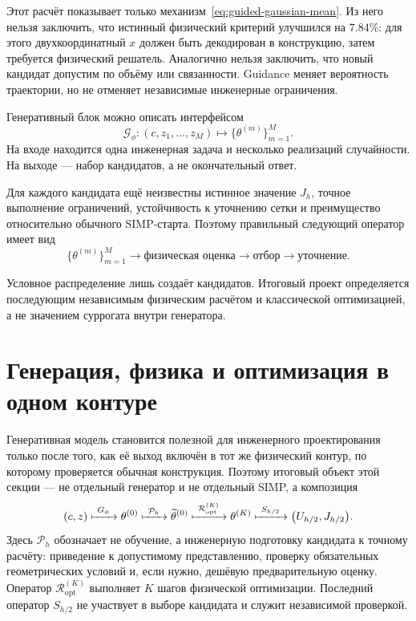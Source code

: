 Этот расчёт показывает только механизм~\eqref{eq:guided-gaussian-mean}. Из него нельзя заключить, что истинный физический критерий улучшился на $7.84\%$: для этого двухкоординатный $x$ должен быть декодирован в конструкцию, затем требуется физический решатель. Аналогично нельзя заключить, что новый кандидат допустим по объёму или связанности. Guidance меняет вероятность траектории, но не отменяет независимые инженерные ограничения.

Генеративный блок можно описать интерфейсом
\begin{equation}
 \mathcal G_\phi:
 (c,z_1,\ldots,z_M)
 \longmapsto
 \{\theta^{(m)}\}_{m=1}^{M}.
\end{equation}
На входе находится одна инженерная задача и несколько реализаций случайности. На выходе --- набор кандидатов, а не окончательный ответ.

Для каждого кандидата ещё неизвестны истинное значение $J_h$, точное выполнение ограничений, устойчивость к уточнению сетки и преимущество относительно обычного SIMP-старта. Поэтому правильный следующий оператор имеет вид
\begin{equation}
 \{\theta^{(m)}\}_{m=1}^{M}
 \longrightarrow
 \text{физическая оценка}
 \longrightarrow
 \text{отбор}
 \longrightarrow
 \text{уточнение}.
\end{equation}

Условное распределение лишь создаёт кандидатов. Итоговый проект определяется последующим независимым физическим расчётом и классической оптимизацией, а не значением суррогата внутри генератора.

\section{Генерация, физика и оптимизация в одном контуре}
\label{sec:generative-optimization-loop}

Генеративная модель становится полезной для инженерного проектирования только после того, как её выход включён в тот же физический контур, по которому проверяется обычная конструкция. Поэтому итоговый объект этой секции --- не отдельный генератор и не отдельный SIMP, а композиция
\begin{equation}
 (c,z)
 \xmapsto{\ G_\phi\ }
 \theta^{(0)}
 \xmapsto{\ \mathcal P_h\ }
 \widetilde\theta^{(0)}
 \xmapsto{\ \mathcal R_{\mathrm{opt}}^{(K)}\ }
 \theta^{(K)}
 \xmapsto{\ S_{h/2}\ }
 \bigl(U_{h/2},J_{h/2}\bigr).
\end{equation}
Здесь $\mathcal P_h$ обозначает не обучение, а инженерную подготовку кандидата к точному расчёту: приведение к допустимому представлению, проверку обязательных геометрических условий и, если нужно, дешёвую предварительную оценку. Оператор $\mathcal R_{\mathrm{opt}}^{(K)}$ выполняет $K$ шагов физической оптимизации. Последний оператор $S_{h/2}$ не участвует в выборе кандидата и служит независимой проверкой.

